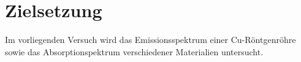 \section{Zielsetzung}
\label{sec:Zielsetzung}
Im vorliegenden Versuch wird das Emissionsspektrum einer Cu-Röntgenröhre sowie das Absorptionspektrum verschiedener Materialien untersucht.
